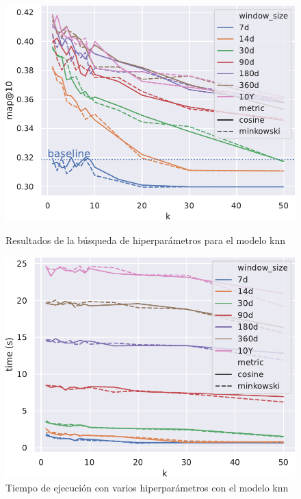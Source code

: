 \begin{figure}
    \begin{minipage}{.48\textwidth}
        \includegraphics[width=\linewidth]{figures/04_implementacion/11_knn_results_all_W-THU_normalize=True.pdf}
        \caption{Resultados de la búsqueda de hiperparámetros para el modelo \acrshort{knn}}
        \label{fig:knn_results_all}
    \end{minipage}%
    \hfill%
    \begin{minipage}{.48\textwidth}
        \includegraphics[width=\linewidth]{figures/04_implementacion/11_knn_results_time_W-THU_normalize=True.pdf}
        \caption{Tiempo de ejecución con varios hiperparámetros con el modelo \acrshort{knn}}
        \label{fig:knn_results_time}
    \end{minipage}
\end{figure}

